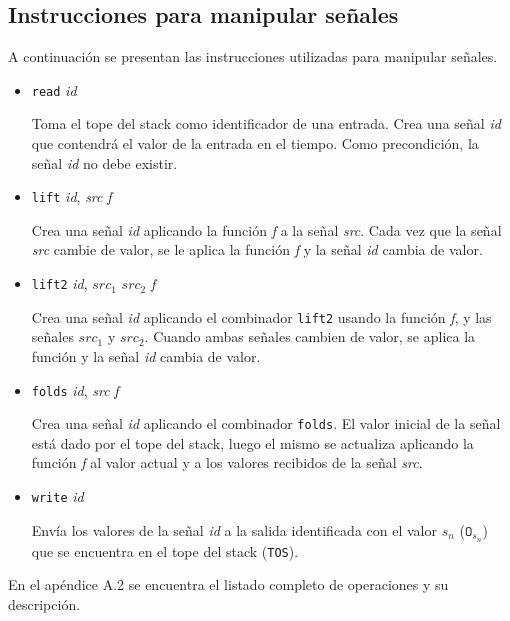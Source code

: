 \subsection{Instrucciones para manipular señales}
  
  A continuación se presentan las instrucciones utilizadas para manipular
señales.
  \begin{itemize}

\item {
    \texttt{read} \textit{id}

      Toma el tope del stack como identificador de una entrada.
      Crea una señal \textit{id} que contendrá el valor de la entrada
    en el tiempo.
      Como precondición, la señal \textit{id} no debe existir.

    
}
\item {
    \texttt{lift} \textit{id}, \textit{src} \textit{f}

      Crea una señal \textit{id} aplicando la función \textit{f}
    a la señal \textit{src}.
      Cada vez que la señal \textit{src} cambie de valor, se le aplica
      la función \textit{f} y la señal \textit{id} cambia de valor.
  
    
}
\item {
  \texttt{lift2} \textit{id}, $\textit{src}_1$ $\textit{src}_2$ \textit{f}

      Crea una señal \textit{id} aplicando el combinador \texttt{lift2}
    usando la función \textit{f}, y las señales $\textit{src}_1$ y
  $\textit{src}_2$.
      Cuando ambas señales cambien de valor, se aplica la función
      y la señal \textit{id} cambia de valor.

    
}
\item {
    \texttt{folds} \textit{id}, \textit{src} \textit{f}

      Crea una señal \textit{id} aplicando el combinador \texttt{folds}.
    El valor inicial de la señal está dado por el tope del stack, luego
    el mismo se actualiza aplicando la función \textit{f} al valor actual
    y a los valores recibidos de la señal \textit{src}.

    
}
\item {
    \texttt{write} \textit{id}

    Envía los valores de la señal \textit{id} a la salida identificada
    con el valor $s_n$ ($\texttt{O}_{s_n}$) que se encuentra en el
    tope del stack (\texttt{TOS}).
    
    
}
\end{itemize}

  En el apéndice A.2 se encuentra el listado completo de operaciones y su
descripción.
